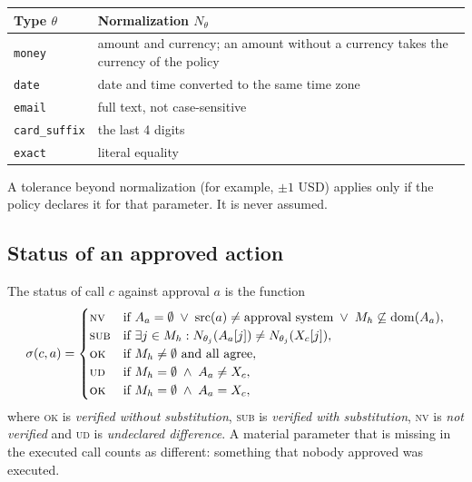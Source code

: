 \documentclass[11pt,a4paper]{article}
\begin{document}
\begin{center}
\begin{tabular}{@{}lp{11cm}@{}}
\toprule
Type $\theta$ & Normalization $N_\theta$ \\
\midrule
\texttt{money} & amount and currency; an amount without a currency takes the currency of the policy \\
\texttt{date} & date and time converted to the same time zone \\
\texttt{email} & full text, not case-sensitive \\
\texttt{card\_suffix} & the last 4 digits \\
\texttt{exact} & literal equality \\
\bottomrule
\end{tabular}
\end{center}

A tolerance beyond normalization (for example, $\pm 1$ USD) applies only if the policy declares it for that
parameter. It is never assumed.

\subsection{Status of an approved action}

The status of call $c$ against approval $a$ is the function
\begin{equation}
  \sigma(c,a) =
  \begin{cases}
    \textsc{nv} & \text{if } A_a = \emptyset \;\vee\; \mathrm{src}(a) \neq \text{approval system} \;\vee\; M_h \not\subseteq \mathrm{dom}(A_a), \\
    \textsc{sub} & \text{if } \exists j \in M_h : N_{\theta_j}(A_a[j]) \neq N_{\theta_j}(X_c[j]), \\
    \textsc{ok} & \text{if } M_h \neq \emptyset \text{ and all agree}, \\
    \textsc{ud} & \text{if } M_h = \emptyset \;\wedge\; A_a \neq X_c, \\
    \textsc{ok} & \text{if } M_h = \emptyset \;\wedge\; A_a = X_c,
  \end{cases}
\end{equation}
where \textsc{ok} is \emph{verified without substitution}, \textsc{sub} is \emph{verified with substitution},
\textsc{nv} is \emph{not verified} and \textsc{ud} is \emph{undeclared difference}. A material parameter that is
missing in the executed call counts as different: something that nobody approved was executed.
\end{document}
